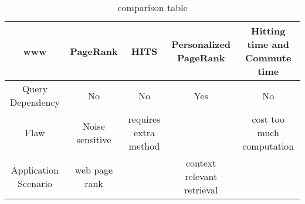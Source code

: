 \documentclass{article}
\begin{document}
\renewcommand\arraystretch{1.8}
\begin{table}
\centering
\caption{comparison table}
\begin{tabular*}{16cm}{ccccc}
    \hline
    www & PageRank & HITS & Personalized PageRank &Hitting time and Commute time\\
    \hline
    Query Dependency & No & No & Yes & No \\
    Flaw & Noise sensitive  & requires extra method & \quad & cost too much computation \\
    Application Scenario & web page rank &  & context relevant retrieval & \\
    \hline
\end{tabular*}
\end{table}
\end{document}

